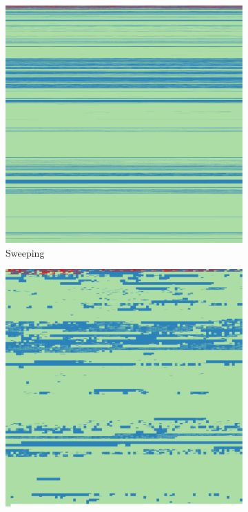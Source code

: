 \documentclass[
  digital, %
  color,   %
  oneside, %
  lof,     %
  nolot,     %
]{fithesis4}
\begin{document}
\begin{figure}
    \centering
    \begin{subfigure}[t]{.45\textwidth}
        \centering
        \includegraphics[width=\textwidth,interpolate=false]{pv204_fde-chi2-4-sweeping.png}
        \caption{Sweeping}
        \label{fig:impl-sweeping}
    \end{subfigure}
    \hfill
    \begin{subfigure}[t]{.45\textwidth}
        \centering
        \includegraphics[width=\textwidth,interpolate=false]{pv204_fde-chi2-4-sweeping-blocks.png}

\end{subfigure}
\end{figure}
\end{document}
